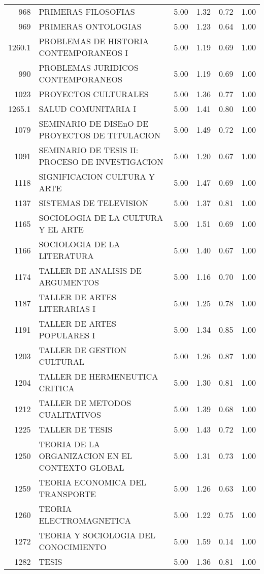 \documentclass[12pt]{article}
\begin{document}
\begin{table}[ht]
\begin{tabular}{rlrrrr}
  968 & PRIMERAS FILOSOFIAS & 5.00 & 1.32 & 0.72 & 1.00 \\ 
  969 & PRIMERAS ONTOLOGIAS & 5.00 & 1.23 & 0.64 & 1.00 \\ 
  1260.1 & PROBLEMAS DE HISTORIA CONTEMPORANEOS I & 5.00 & 1.19 & 0.69 & 1.00 \\ 
  990 & PROBLEMAS JURIDICOS CONTEMPORANEOS & 5.00 & 1.19 & 0.69 & 1.00 \\ 
  1023 & PROYECTOS CULTURALES & 5.00 & 1.36 & 0.77 & 1.00 \\ 
  1265.1 & SALUD COMUNITARIA I & 5.00 & 1.41 & 0.80 & 1.00 \\ 
  1079 & SEMINARIO DE DISEnO DE PROYECTOS DE TITULACION & 5.00 & 1.49 & 0.72 & 1.00 \\ 
  1091 & SEMINARIO DE TESIS II: PROCESO DE INVESTIGACION & 5.00 & 1.20 & 0.67 & 1.00 \\ 
  1118 & SIGNIFICACION CULTURA Y ARTE & 5.00 & 1.47 & 0.69 & 1.00 \\ 
  1137 & SISTEMAS DE TELEVISION & 5.00 & 1.37 & 0.81 & 1.00 \\ 
  1165 & SOCIOLOGIA DE LA CULTURA Y EL ARTE & 5.00 & 1.51 & 0.69 & 1.00 \\ 
  1166 & SOCIOLOGIA DE LA LITERATURA & 5.00 & 1.40 & 0.67 & 1.00 \\ 
  1174 & TALLER DE ANALISIS DE ARGUMENTOS & 5.00 & 1.16 & 0.70 & 1.00 \\ 
  1187 & TALLER DE ARTES LITERARIAS I & 5.00 & 1.25 & 0.78 & 1.00 \\ 
  1191 & TALLER DE ARTES POPULARES I & 5.00 & 1.34 & 0.85 & 1.00 \\ 
  1203 & TALLER DE GESTION CULTURAL & 5.00 & 1.26 & 0.87 & 1.00 \\ 
  1204 & TALLER DE HERMENEUTICA CRITICA & 5.00 & 1.30 & 0.81 & 1.00 \\ 
  1212 & TALLER DE METODOS CUALITATIVOS & 5.00 & 1.39 & 0.68 & 1.00 \\ 
  1225 & TALLER DE TESIS & 5.00 & 1.43 & 0.72 & 1.00 \\ 
  1250 & TEORIA DE LA ORGANIZACION EN EL CONTEXTO GLOBAL & 5.00 & 1.31 & 0.73 & 1.00 \\ 
  1259 & TEORIA ECONOMICA DEL TRANSPORTE & 5.00 & 1.26 & 0.63 & 1.00 \\ 
  1260 & TEORIA ELECTROMAGNETICA & 5.00 & 1.22 & 0.75 & 1.00 \\ 
  1272 & TEORIA Y SOCIOLOGIA DEL CONOCIMIENTO & 5.00 & 1.59 & 0.14 & 1.00 \\ 
  1282 & TESIS & 5.00 & 1.36 & 0.81 & 1.00 \\ 

\end{tabular}
\end{table}
\end{document}

